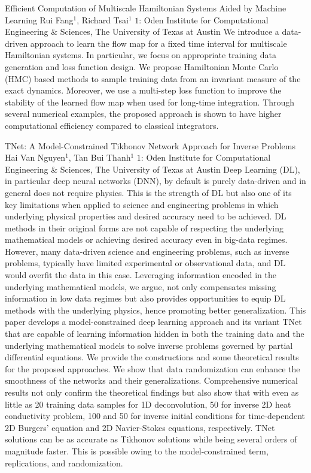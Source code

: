 \vspace{1.5ex}
\abs
{Efficient Computation of Multiscale Hamiltonian Systems Aided by Machine Learning}
{Rui Fang$^1$, Richard Tsai$^1$}
{$1$: Oden Institute for Computational Engineering $\&$ Sciences, The University of Texas at Austin}
{We introduce a data-driven approach to learn the flow map for a fixed time interval for multiscale Hamiltonian systems. In particular, we focus on appropriate training data generation and loss function design. We propose Hamiltonian Monte Carlo (HMC) based methods to sample training data from an invariant measure of the exact dynamics. Moreover, we use a multi-step loss function to improve the stability of the learned flow map when used for long-time integration. Through several numerical examples, the proposed approach is shown to have higher computational efficiency compared to classical integrators.}


\vspace{1.5ex}
\abs
{TNet: A Model-Constrained Tikhonov Network Approach for Inverse Problems}
{Hai Van Nguyen$^1$, Tan Bui Thanh$^1$}
{$1$: Oden Institute for Computational Engineering \& Sciences, The University of Texas at Austin}
{Deep Learning (DL), in particular deep neural networks (DNN), by default is purely data-driven and in general does not require physics. This is the strength of DL but also one of its key limitations when applied to science and engineering problems in which underlying physical properties and desired accuracy need to be achieved. DL methods in their original forms are not capable of respecting the underlying mathematical models or achieving desired accuracy even in big-data regimes. However, many data-driven science and engineering problems, such as inverse problems, typically have limited experimental or observational data, and DL would overfit the data in this case. Leveraging information encoded in the underlying mathematical models, we argue, not only compensates missing information in low data regimes but also provides opportunities to equip DL methods with the underlying physics, hence promoting better generalization. This paper develops a model-constrained deep learning approach and its variant TNet that are capable of learning information hidden in both the training data and the underlying mathematical models to solve inverse problems governed by partial differential equations. We provide the constructions and some theoretical results for the proposed approaches. We show that data randomization can enhance the smoothness of the networks and their generalizations. Comprehensive numerical results not only confirm the theoretical findings but also show that with even as little as 20 training data samples for 1D deconvolution, 50 for inverse 2D heat conductivity problem, 100 and 50 for inverse initial conditions for time-dependent 2D Burgers' equation and 2D Navier-Stokes equations, respectively. TNet solutions can be as accurate as Tikhonov solutions while being several orders of magnitude faster. This is possible owing to the model-constrained term, replications, and randomization.}


